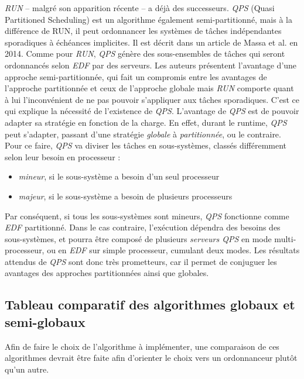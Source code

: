 \documentclass[11pt,a4paper,oneside]{report}
\begin{document}
	\textit{RUN} -- malgré son apparition récente -- a déjà des successeurs. \textit{QPS}
	(Quasi Partitioned Scheduling) est un algorithme 
	également semi-partitionné, mais à la différence de RUN, il peut ordonnancer les systèmes de tâches indépendantes sporadiques à échéances implicites. 
	Il est décrit dans un article de Massa et al. \cite{massa_outstanding_2014} en 2014. 
	Comme pour \textit{RUN}, \textit{QPS} génère des sous-ensembles de tâches qui seront ordonnancés 
	selon \textit{EDF} par des serveurs. Les auteurs présentent l'avantage d'une approche semi-partitionnée, 
	qui fait un compromis entre les avantages de l'approche partitionnée et ceux de l'approche globale 
	mais \textit{RUN} comporte quant à lui l'inconvénient de ne pas pouvoir s'appliquer aux tâches sporadiques. C'est ce qui explique la nécessité de l'existence de \textit{QPS}.
	L'avantage de \textit{QPS} est de pouvoir adapter sa stratégie en fonction de la
	charge. En effet, durant le runtime, \textit{QPS} peut s'adapter, passant d'une
	stratégie \textit{globale} à \textit{partitionnée}, ou le contraire. 
	Pour ce faire, \textit{QPS} va diviser les tâches en sous-systèmes, classés différemment selon leur besoin en processeur :\medskip
	\begin{itemize}
		\item \textit{mineur}, si le sous-système a besoin d'un seul processeur
		\item \textit{majeur}, si le sous-système a besoin de plusieurs processeurs
	\end{itemize}
	Par conséquent, si tous les sous-systèmes sont mineurs, \textit{QPS} fonctionne comme 
	\textit{EDF} partitionné. Dans le cas contraire, l'exécution dépendra des besoins 
	des sous-systèmes, et pourra être composé de plusieurs \textit{serveurs QPS} 
	en mode multi-processeur, ou en \textit{EDF} sur simple processeur, cumulant 
	deux modes. \medskip
	Les résultats attendus de \textit{QPS} sont donc très prometteurs, car il permet de 
	conjuguer les avantages des approches partitionnées ainsi que globales.
	
	\subsection{Tableau comparatif des algorithmes globaux et semi-globaux}
	Afin de faire le choix de l'algorithme à implémenter, une comparaison de ces algorithmes 
	devrait être faite afin d'orienter le choix vers un ordonnanceur plutôt qu'un autre. 
	
	\vspace{1em}
	
\end{document}
